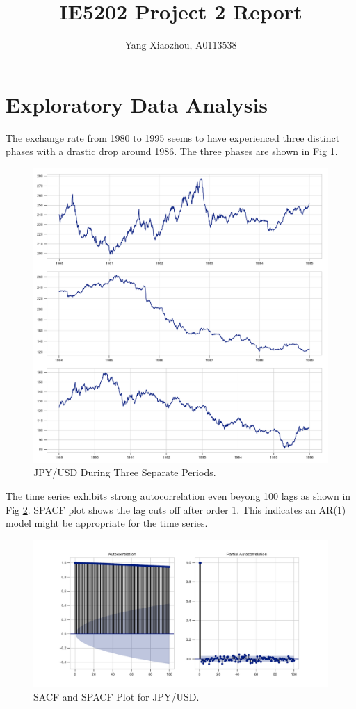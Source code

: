 \documentclass[]{article}
\title{IE5202 Project 2 Report}
\author{Yang Xiaozhou, A0113538}
\begin{document}
\maketitle

\section{Exploratory Data Analysis}

The exchange rate from 1980 to 1995 seems to have experienced three distinct phases with a drastic drop around 1986. The three phases are shown in Fig \ref{fig:jpy_usd_three_peridos}.
%
\begin{figure}[hbtp]
	\centering
	\includegraphics[width=1\columnwidth]{../Figures/jpy_usd_three_periods.pdf}
	\caption{JPY/USD During Three Separate Periods.}
	\label{fig:jpy_usd_three_peridos}
\end{figure}
%
The time series exhibits strong autocorrelation even beyong 100 lags as shown in Fig \ref{fig:sacf_n_spacf_plot}. SPACF plot shows the lag cuts off after order 1. This indicates an AR(1) model might be appropriate for the time series. 
%
\begin{figure}[hbtp]
	\centering
	\includegraphics[width=1\columnwidth]{../Figures/sacf_n_spacf_plot.pdf}
	\caption{SACF and SPACF Plot for JPY/USD.}
	\label{fig:sacf_n_spacf_plot}
\end{figure}
\end{document}
